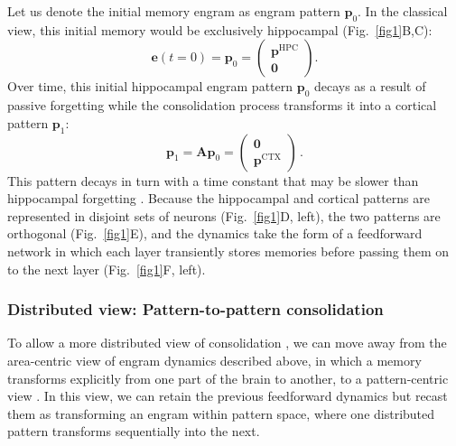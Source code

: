 Let us denote the initial memory engram as engram pattern $\mathbf{p}_0$. In the classical view, this initial memory would be exclusively hippocampal (Fig.~\ref{fig1}B,C):
%
\begin{equation}\label{eq:initial_engram}
  \mathbf{e}(t=0) = \mathbf{p}_0 = \begin{pmatrix}
    \mathbf{p}^{\mathrm{HPC}} \\[1ex]
    \mathbf{0}
  \end{pmatrix}.
\end{equation}
%
Over time, this initial hippocampal engram pattern $\mathbf{p}_0$ decays as a result of passive forgetting while the consolidation process transforms it into a cortical pattern $\mathbf{p}_1$:
%
\begin{equation}\label{eq:cortical_engram}
  \mathbf{p}_1 = \mathbf{A} \mathbf{p}_0 = \begin{pmatrix}
    \mathbf{0} \\[1ex]
    \mathbf{p}^{\mathrm{CTX}}
  \end{pmatrix} \,.
\end{equation}
%
This pattern decays in turn with a time constant that %
may be slower than hippocampal forgetting \citep{McClelland1995}. %
Because the hippocampal and cortical patterns are represented in disjoint sets of neurons (Fig.~\ref{fig1}D, left), the two patterns are orthogonal (Fig.~\ref{fig1}E), and the dynamics take the form of a feedforward network in which each layer transiently stores memories before passing them on to the next layer (Fig.~\ref{fig1}F, left).

\subsubsection{Distributed view: Pattern-to-pattern consolidation}

To allow a more distributed view of consolidation \citep{Roy2022}, we can move away from the area-centric view of engram dynamics described above, in which a memory transforms explicitly from one part of the brain to another, to a pattern-centric view \citep{Goldman2009, Ganguli2008}. In this view, we can retain the previous feedforward dynamics but recast them as transforming an engram within pattern space, where one distributed pattern transforms sequentially into the next.

